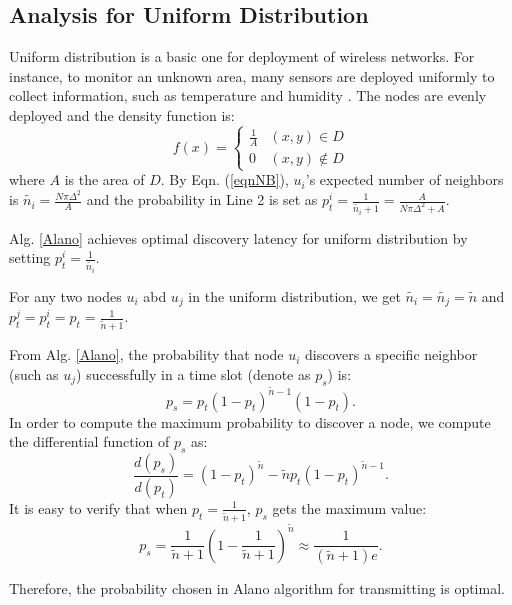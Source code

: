 \subsection{Analysis for Uniform Distribution}
\label{uniform}
Uniform distribution is a basic one for deployment of wireless networks.
For instance, to monitor an unknown area, many sensors are deployed uniformly to collect information, such as temperature and humidity \cite{flammini2007real}. The nodes are evenly deployed and the density function is:
$$f(x)=
\begin{cases}
\frac{1}{A}& (x,y)\in D\\
0& (x,y)\notin D
\end{cases}$$
where $A$ is the area of $D$.
By Eqn. (\ref{eqnNB}), $u_i$'s expected number of neighbors is $\widetilde{n_i} = \frac{N\pi \Delta^2}{A}$ and the probability in Line 2 is set as $p_t^i = \frac{1}{\widetilde{n_i}+1}=\frac{A}{N\pi \Delta^2+A}$. 
\begin{lemma}
Alg. \ref{Alano} achieves optimal discovery latency for uniform distribution by setting $p_t^i = \frac{1}{\widetilde{n_i}}$.
\end{lemma}
\begin{IEEEproof}
For any two nodes $u_i$ abd $u_j$ in the uniform distribution, we get $\widetilde{n_i} = \widetilde{n_j} = \widetilde{n}$ and $p_t^j = p_t^ i = p_t = \frac{1}{\widetilde{n}+1}$.



From Alg. \ref{Alano}, the probability that node $u_i$ discovers a specific neighbor (such as $u_j$) successfully in a time slot (denote as $p_s$) is:
$$
p_s = p_t{(1-p_t)}^{\widetilde{n}-1}(1-p_t).
$$
In order to compute the maximum probability to discover a node, we compute the differential function of $p_s$ as:
$$
\frac{d(p_s)}{d(p_t)} = {(1-p_t)}^{\widetilde{n}}-\widetilde{n}p_t{(1-p_t)}^{\widetilde{n}-1}.
$$
It is easy to verify that when $p_t=\frac{1}{\widetilde{n}+1}$, $p_s$ gets the maximum value:
$$p_s = \frac{1}{\widetilde{n}+1}{(1-\frac{1}{\widetilde{n}+1})}^{\widetilde{n}} \approx \frac{1}{(\widetilde{n}+1)e}.$$

Therefore, the probability chosen in Alano algorithm for transmitting is optimal.
\end{IEEEproof}



